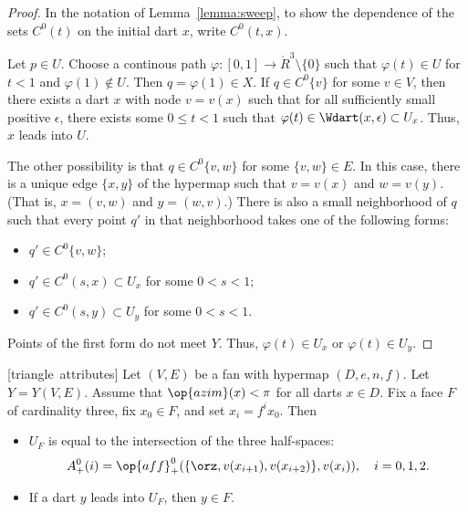 \begin{proof}  
In the notation of Lemma~\ref{lemma:sweep}, to show the dependence of the sets $C^0(t)$ on the initial dart $x$, write $C^0(t,x)$.

Let $p\in U$.  Choose a continous path $\varphi:[0,1]\to \ring{R}^3\setminus\{0\}$
such that $\varphi(t)\in U$ for $t<1$ and $\varphi(1)\not\in U$.  Then
$q=\varphi(1)\in X$.  If $q\in C^0\{v\}$ for some $v\in V$,
then there exists a dart $x$ with node $v = v(x)$ such that for all sufficiently small positive $\epsilon$, there exists some $0\le t < 1$ such that  $\varphi(t)\in \Wdart(x,\epsilon)\subset U_x$.  
Thus, $x$ leads into $U$.
%

The other possibility is that
$q\in C^0\{v,w\}$ for some $\{v,w\}\in E$.  In this case, there is a unique
edge $\{x,y\}$ of the hypermap such that $v=v(x)$ and $w=v(y)$.   (That is, $x=(v,w)$ and $y=(w,v)$.)
There
is also a small neighborhood of $q$ such that every point $q'$ in that neighborhood
takes one of the following forms:
\begin{itemize} \item $q'\in C^0\{v,w\}$;
\item $q'\in C^0(s,x)\subset U_x$ for some $0<s<1$;
\item $q'\in C^0(s,y)\subset U_y$ for some $0<s<1$.
\end{itemize}
Points of the first form do not meet $Y$.  Thus,  $\varphi(t)\in U_x$ or $\varphi(t)\in U_y$.  
\end{proof}

\begin{lemma}[triangle~attributes] \label{lemma:triangle}
Let $(V,E)$ be a fan with hypermap $(D,e,n,f)$. 
Let $Y=Y(V,E)$.
Assume that $\op{azim}(x)<\pi$
for all darts $x\in D$.  Fix a face $F$ of cardinality three, fix
$x_0\in F$, and set $x_i = f^i x_0$. Then
%
\begin{itemize}  
\item $U_F$ is equal to the intersection of the three half-spaces:
$$A^0_+(i)=\op{aff}_+^0(\{\orz,v(x_{i+1}),v(x_{i+2})\},v(x_i)),\quad i=0,1,2.$$
\item If a dart $y$ leads into $U_F$, then $y\in F$.
\end{itemize}
\end{lemma}
%

